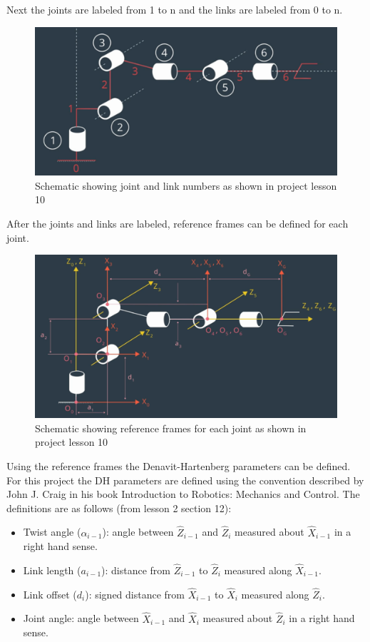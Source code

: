 \documentclass{article}
\begin{document}
Next the joints are labeled from 1 to n and the links are labeled from 0 to n.

\begin{figure}[H]
    \includegraphics[width=\linewidth]{KR210JL.png}
    \caption{Schematic showing joint and link numbers as shown in project lesson 10}
    \label{fig:JLscheme}
\end{figure}

After the joints and links are labeled, reference frames can be defined for each joint.

\begin{figure}[H]
    \includegraphics[width=\linewidth]{KR210RF.png}
    \caption{Schematic showing reference frames for each joint as shown in project lesson 10}
    \label{fig:RFscheme}
\end{figure}

Using the reference frames the Denavit-Hartenberg parameters can be defined. For this project the DH parameters are defined using the convention described by John J. Craig in his book Introduction to Robotics: Mechanics and Control. The definitions are as follows (from lesson 2 section 12):

\begin{itemize}
    \item Twist angle ($\alpha _{i-1}$): angle between $\hat{Z}_{i-1}$ and $\hat{Z}_i$ measured about $\hat{X}_{i-1}$ in a right hand sense.
    \item Link length ($a_{i-1}$): distance from $\hat{Z}_{i-1}$ to $\hat{Z}_i$ measured along $\hat{X}_{i-1}$.
    \item Link offset ($d_i$): signed distance from $\hat{X}_{i-1}$ to $\hat{X}_i$ measured along $\hat{Z}_i$.
    \item Joint angle: angle between $\hat{X}_{i-1}$ and $\hat{X}_i$ measured about $\hat{Z}_i$ in a right hand sense.
\end{itemize}
\end{document}
